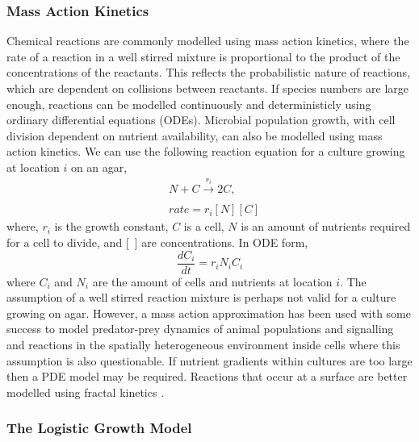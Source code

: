 \begin{multicols}{2}
\subsubsection{Mass Action Kinetics}
Chemical reactions are commonly modelled using mass action kinetics, where the rate of a
reaction in a well stirred mixture is proportional to the product of the concentrations of
the reactants. This reflects the probabilistic nature of reactions, which are dependent on
collisions between reactants. If species numbers are large enough, reactions can be
modelled continuously and deterministicly using ordinary differential equations
(ODEs). Microbial population growth, with cell division dependent on nutrient
availability, can also be modelled using mass action kinetics. We can use the following
reaction equation for a culture growing at location \(i\) on an agar,
\begin{subequations}
  \label{eq:9}
  \begin{align}
    &N + C \xrightarrow[]{r_{i}} 2C,\\
    &rate = r_{i}[N][C]
  \end{align}
\end{subequations}
where, \(r_{i}\) is the growth constant, \(C\) is a cell, \(N\) is an amount of nutrients
required for a cell to divide, and [~] are concentrations. In ODE form,
\begin{equation}
  \label{eq:10}
  \frac{dC_{i}}{dt} = r_{i}N_{i}C_{i}
\end{equation}
where \(C_{i}\) and \(N_{i}\) are the amount of cells and nutrients at location \(i\).
The assumption of a well stirred reaction mixture is perhaps not valid for a culture
growing on agar. However, a mass action approximation has been used with some success to
model predator-prey dynamics of animal populations \citep{Berryman1992} and signalling and
reactions in the spatially heterogeneous environment inside cells
\citep{Aldridge2006,Chen2010} where this assumption is also questionable. If nutrient
gradients within cultures are too large then a PDE model may be required. Reactions that
occur at a surface are better modelled using fractal kinetics \citep{savageau1995}.
\subsubsection{The Logistic Growth Model}


\end{multicols}
